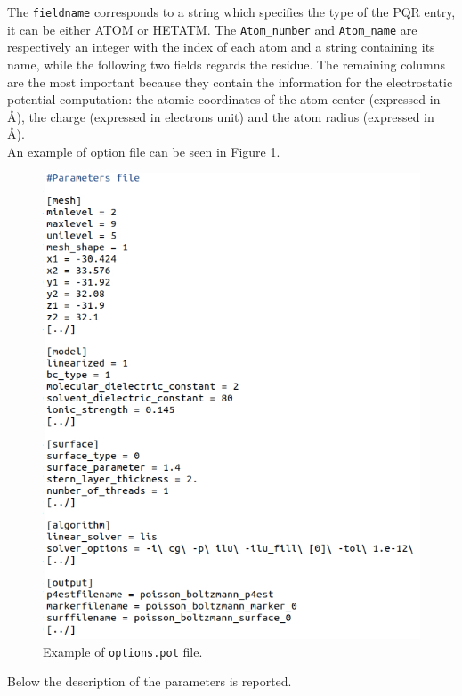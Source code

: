 \documentclass[11pt,a4paper]{article}
\begin{document}
The \texttt{fieldname} corresponds to a string which specifies the type of the PQR entry, it can be either ATOM or HETATM. The \texttt{Atom\_number} and \texttt{Atom\_name} are respectively an integer with the index of each atom and a string containing its name, while the following two fields regards the residue. The remaining columns are the most important because they contain the information for the electrostatic potential computation: the atomic coordinates of the atom center (expressed in \AA), the charge (expressed in electrons unit) and the atom radius (expressed in \AA). \\

An example of option file can be seen in Figure \ref{fig:pot_example}. 

\begin{figure}[H]
    \centering
    \includegraphics[scale = 0.4]{Images/pot.jpg}
    \caption{Example of \texttt{options.pot} file.}
    \label{fig:pot_example}
\end{figure}
Below the description of the parameters is reported.
\end{document}
